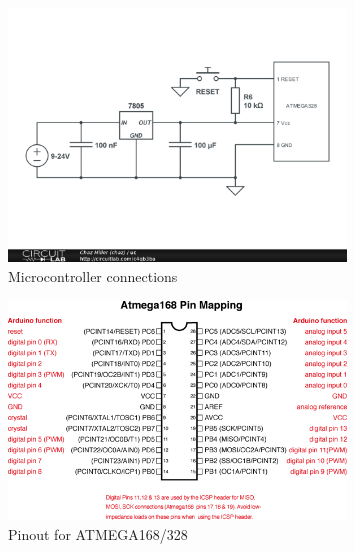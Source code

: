 \documentclass[dvips,12pt]{article}
\begin{document}
\begin{figure}[h]
    \begin{centering}
    \includegraphics[width=0.8\textwidth]{uc}
    \caption{Microcontroller connections} 
    \label{fig:uc}
    \end{centering}
\end{figure}
\begin{figure}[h]
    \begin{centering}
    \includegraphics[width=0.8\textwidth]{pins}
    \caption{Pinout for ATMEGA168/328} 
    \label{fig:pins}
    \end{centering}
\end{figure}




\centering
\vspace{2cm}
\appendix
\end{document}
